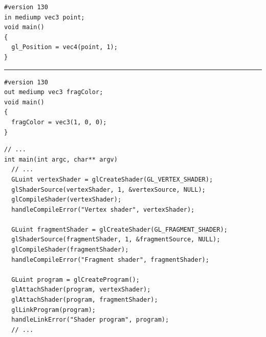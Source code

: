 \documentclass[calcdimensions,landscape,letterpaper]{powersem}
\newcommand{\thecurrentheading}{}
\newcommand{\heading}[1]{\renewcommand{\thecurrentheading}{#1}}
\begin{document}
\begin{slide}
    \heading{Minimal Shaders (OpenGL Shader Language (GLSL))}
    \begin{center}
        \begin{minipage}[c]{.5\textwidth}
            \begin{verbatim}
#version 130
in mediump vec3 point;
void main()
{
  gl_Position = vec4(point, 1);
}
            \end{verbatim}
            \rule{4cm}{0.4pt}
            \begin{verbatim}
#version 130
out mediump vec3 fragColor;
void main()
{
  fragColor = vec3(1, 0, 0);
}
            \end{verbatim}
        \end{minipage}
    \end{center}
\end{slide}

\begin{slide}
    \heading{Compile \& Link Shaders}
    \begin{center}
        \begin{minipage}[c]{.95\textwidth}
            \begin{verbatim}
// ...
int main(int argc, char** argv)
  // ...
  GLuint vertexShader = glCreateShader(GL_VERTEX_SHADER);
  glShaderSource(vertexShader, 1, &vertexSource, NULL);
  glCompileShader(vertexShader);
  handleCompileError("Vertex shader", vertexShader);

  GLuint fragmentShader = glCreateShader(GL_FRAGMENT_SHADER);
  glShaderSource(fragmentShader, 1, &fragmentSource, NULL);
  glCompileShader(fragmentShader);
  handleCompileError("Fragment shader", fragmentShader);

  GLuint program = glCreateProgram();
  glAttachShader(program, vertexShader);
  glAttachShader(program, fragmentShader);
  glLinkProgram(program);
  handleLinkError("Shader program", program);
  // ...
            \end{verbatim}
        \end{minipage}
    \end{center}
\end{slide}
\end{document}
